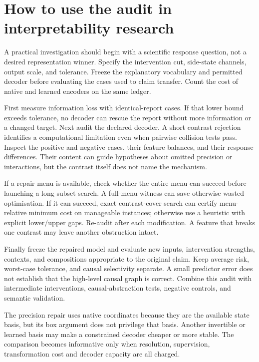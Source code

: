 \documentclass[
  british,
  11pt,
  a4paper,
]{article}
\begin{document}
\section{How to use the audit in interpretability
research}\label{how-to-use-the-audit-in-interpretability-research}

A practical investigation should begin with a scientific response
question, not a desired representation winner. Specify the intervention
cut, side-state channels, output scale, and tolerance. Freeze the
explanatory vocabulary and permitted decoder before evaluating the cases
used to claim transfer. Count the cost of native and learned encoders on
the same ledger.

First measure information loss with identical-report cases. If that
lower bound exceeds tolerance, no decoder can rescue the report without
more information or a changed target. Next audit the declared decoder. A
short contrast rejection identifies a computational limitation even when
pairwise collision tests pass. Inspect the positive and negative cases,
their feature balances, and their response differences. Their content
can guide hypotheses about omitted precision or interactions, but the
contrast itself does not name the mechanism.

If a repair menu is available, check whether the entire menu can succeed
before launching a long subset search. A full-menu witness can save
otherwise wasted optimisation. If it can succeed, exact contrast-cover
search can certify menu-relative minimum cost on manageable instances;
otherwise use a heuristic with explicit lower/upper gaps. Re-audit after
each modification. A feature that breaks one contrast may leave another
obstruction intact.

Finally freeze the repaired model and evaluate new inputs, intervention
strengths, contexts, and compositions appropriate to the original claim.
Keep average risk, worst-case tolerance, and causal selectivity
separate. A small predictor error does not establish that the high-level
causal graph is correct. Combine this audit with intermediate
interventions, causal-abstraction tests, negative controls, and semantic
validation.

The precision repair uses native coordinates because they are the
available state basis, but its box argument does not privilege that
basis. Another invertible or learned basis may make a constrained
decoder cheaper or more stable. The comparison becomes informative only
when resolution, supervision, transformation cost and decoder capacity
are all charged.
\end{document}
